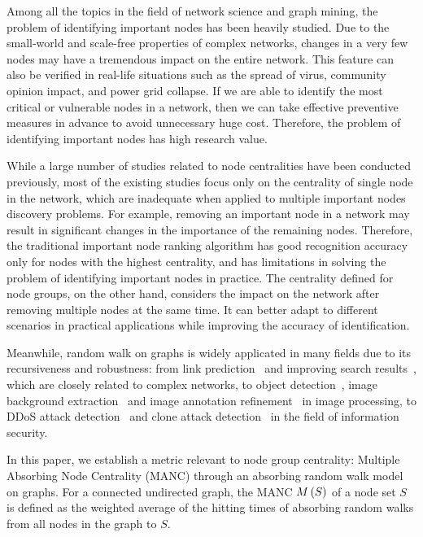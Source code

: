 \documentclass[sigconf]{acmart}
\begin{document}
Among all the topics in the field of network science and graph mining, the problem of identifying important nodes has been heavily studied.
Due to the small-world and scale-free properties of complex networks, changes in a very few nodes may have a tremendous impact on the entire network.
This feature can also be verified in real-life situations such as the spread of virus, community opinion impact, and power grid collapse.
If we are able to identify the most critical or vulnerable nodes in a network, then we can take effective preventive measures in advance to avoid unnecessary huge cost.
Therefore, the problem of identifying important nodes has high research value.

While a large number of studies related to node centralities have been conducted previously, most of the existing studies focus only on the centrality of single node in the network, which are inadequate when applied to multiple important nodes discovery problems.
For example, removing an important node in a network may result in significant changes in the importance of the remaining nodes.
Therefore, the traditional important node ranking algorithm has good recognition accuracy only for nodes with the highest centrality, and has limitations in solving the problem of identifying important nodes in practice.
The centrality defined for node groups, on the other hand, considers the impact on the network after removing multiple nodes at the same time.
It can better adapt to different scenarios in practical applications while improving the accuracy of identification.

Meanwhile, random walk on graphs is widely applicated in many fields due to its recursiveness and robustness: from link prediction~\cite{YiGuWeTiHa10} and improving search results~\cite{LiPeMaQiWeQi10}, which are closely related to complex networks, to object detection~\cite{GoViHuRa10}, image background extraction~\cite{HuWaYeChLa16} and image annotation refinement~\cite{WaJiZhZh10} in image processing, to DDoS attack detection~\cite{XuZhXiYu14} and clone attack detection~\cite{ZeCaZhGuXi10} in the field of information security.

In this paper, we establish a metric relevant to node group centrality: Multiple Absorbing Node Centrality (MANC) through an absorbing random walk model on graphs.
For a connected undirected graph, the MANC \(M\left(S\right)\) of a node set \(S\) is defined as the weighted average of the hitting times of absorbing random walks from all nodes in the graph to \(S\).
\end{document}
